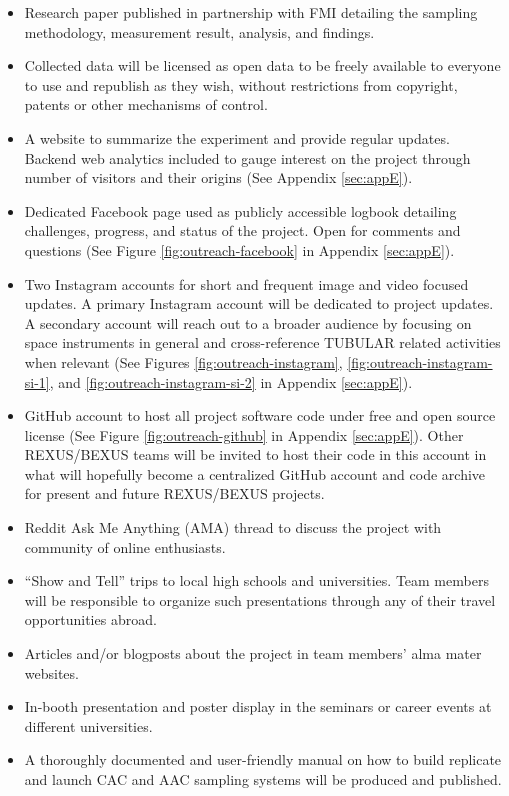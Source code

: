 \documentclass[a4paper,12pt,oneside]{article} %
\begin{document}
\begin{itemize}
\item Research paper published in partnership with FMI detailing the sampling methodology, measurement result, analysis, and findings.
\item Collected data will be licensed as open data to be freely available to everyone to use and republish as they wish, without restrictions from copyright, patents or other mechanisms of control.
\item A website to summarize the experiment and provide regular updates. Backend web analytics included to gauge interest on the project through number of visitors and their origins (See Appendix \ref{sec:appE}).
\item Dedicated Facebook page used as publicly accessible logbook detailing challenges, progress, and status of the project. Open for comments and questions (See Figure \ref{fig:outreach-facebook} in Appendix \ref{sec:appE}).
\item Two Instagram accounts for short and frequent image and video focused updates. A primary Instagram account will be dedicated to project updates. A secondary account will reach out to a broader audience by focusing on space instruments in general and cross-reference TUBULAR related activities when relevant (See Figures \ref{fig:outreach-instagram}, \ref{fig:outreach-instagram-si-1}, and \ref{fig:outreach-instagram-si-2} in Appendix \ref{sec:appE}).
\item GitHub account to host all project software code under free and open source license (See Figure \ref{fig:outreach-github} in Appendix \ref{sec:appE}). Other REXUS/BEXUS teams will be invited to host their code in this account in what will hopefully become a centralized GitHub account and code archive for present and future REXUS/BEXUS projects.
\item Reddit Ask Me Anything (AMA) thread to discuss the project with community of online enthusiasts.
\item\enquote{Show and Tell} trips to local high schools and universities. Team members will be responsible to organize such presentations through any of their travel opportunities abroad.
\item Articles and/or blogposts about the project in team members' alma mater websites.
\item In-booth presentation and poster display in the seminars or career events at different universities. 
\item A thoroughly documented and user-friendly manual on how to build replicate and launch CAC and AAC sampling systems will be produced and published.
\end{itemize}
\pagebreak
\end{document}
